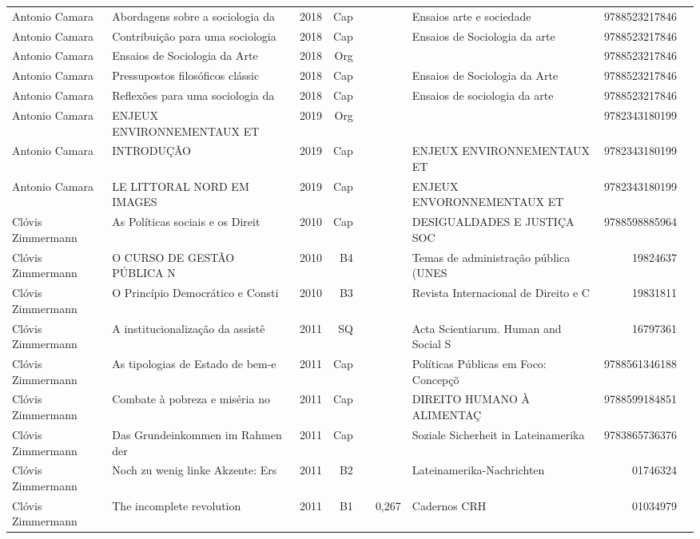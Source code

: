 \documentclass[12pt,brazil]{article}\usepackage[]{graphicx}\usepackage[]{xcolor}
\begin{document}
\begin{longtable}{lllrrllrr}
Antonio Camara & Abordagens sobre a sociologia da & 2018 & Cap &  &  & Ensaios arte e sociedade & 9788523217846 \\
Antonio Camara & Contribuição para uma sociologia & 2018 & Cap &  &  & Ensaios de Sociologia da arte & 9788523217846 \\
Antonio Camara & Ensaios de Sociologia da Arte & 2018 & Org &  &  &  & 9788523217846 \\
Antonio Camara & Pressupostos filosóficos clássic & 2018 & Cap &  &  & Ensaios de Sociologia da Arte & 9788523217846 \\
Antonio Camara & Reflexões para uma sociologia da & 2018 & Cap &  &  & Ensaios de sociologia da arte & 9788523217846 \\
Antonio Camara & ENJEUX ENVIRONNEMENTAUX ET  & 2019 & Org &  &  &  & 9782343180199 \\
Antonio Camara & INTRODUÇÃO & 2019 & Cap &  &  & ENJEUX ENVIRONNEMENTAUX ET  & 9782343180199 \\
Antonio Camara & LE LITTORAL NORD EM IMAGES & 2019 & Cap &  &  & ENJEUX ENVORONNEMENTAUX ET  & 9782343180199 \\
Clóvis Zimmermann & As Políticas sociais e os Direit & 2010 & Cap &  &  & DESIGUALDADES E JUSTIÇA SOC & 9788598885964 \\
Clóvis Zimmermann & O CURSO DE GESTÃO PÚBLICA N & 2010 & B4 &  &  & Temas de administração pública (UNES & 19824637 \\
Clóvis Zimmermann & O Princípio Democrático e Consti & 2010 & B3 &  &  & Revista Internacional de Direito e C & 19831811 \\
Clóvis Zimmermann & A institucionalização da assistê & 2011 & SQ &  &  & Acta Scientiarum. Human and Social S & 16797361 \\
Clóvis Zimmermann & As tipologias de Estado de bem-e & 2011 & Cap &  &  & Políticas Públicas em Foco: Concepçõ & 9788561346188 \\
Clóvis Zimmermann & Combate à pobreza e miséria  no  & 2011 & Cap &  &  & DIREITO HUMANO  À ALIMENTAÇ & 9788599184851 \\
Clóvis Zimmermann & Das Grundeinkommen im Rahmen der & 2011 & Cap &  &  & Soziale Sicherheit in Lateinamerika & 9783865736376 \\
Clóvis Zimmermann & Noch zu wenig linke Akzente: Ers & 2011 & B2 &  &  & Lateinamerika-Nachrichten & 01746324 \\
Clóvis Zimmermann & The incomplete revolution & 2011 & B1 &  & 0,267 & Cadernos CRH & 01034979 \\

\end{longtable}
\end{document}
